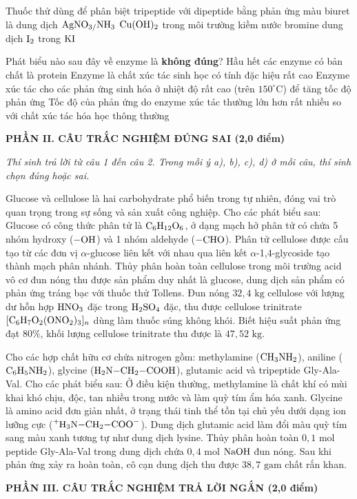 \documentclass[11pt,a4paper]{article}
\begin{document}
\begin{ex}
Thuốc thử dùng để phân biệt tripeptide với dipeptide bằng phản ứng màu biuret là
\choice
{dung dịch $\ce{AgNO3/NH3}$}
{\True $\ce{Cu(OH)2}$ trong môi trường kiềm}
{nước bromine}
{dung dịch $\ce{I2}$ trong $\ce{KI}$}
\end{ex}
\begin{ex}
Phát biểu nào sau đây về enzyme là \textbf{không đúng}?
\choice
{Hầu hết các enzyme có bản chất là protein}
{Enzyme là chất xúc tác sinh học có tính đặc hiệu rất cao}
{\True Enzyme xúc tác cho các phản ứng sinh hóa ở nhiệt độ rất cao (trên $150^\circ\text{C}$) để tăng tốc độ phản ứng}
{Tốc độ của phản ứng do enzyme xúc tác thường lớn hơn rất nhiều so với chất xúc tác hóa học thông thường}
\end{ex}
\vspace{6pt}
\noindent
{\color{mainGreen}\textbf{\large PHẦN II. CÂU TRẮC NGHIỆM ĐÚNG SAI (2,0 điểm)}}

\textit{Thí sinh trả lời từ câu 1 đến câu 2. Trong mỗi ý a), b), c), d) ở mỗi câu, thí sinh chọn đúng hoặc sai.}

\vspace{2pt}

\begin{ex}
Glucose và cellulose là hai carbohydrate phổ biến trong tự nhiên, đóng vai trò quan trọng trong sự sống và sản xuất công nghiệp. Cho các phát biểu sau:
\choiceTF
{\True Glucose có công thức phân tử là $\ce{C6H12O6}$, ở dạng mạch hở phân tử có chứa 5 nhóm hydroxy ($\ce{-OH}$) và 1 nhóm aldehyde ($\ce{-CHO}$).}
{Phân tử cellulose được cấu tạo từ các đơn vị $\alpha$-glucose liên kết với nhau qua liên kết $\alpha$-1,4-glycoside tạo thành mạch phân nhánh.}
{\True Thủy phân hoàn toàn cellulose trong môi trường acid vô cơ đun nóng thu được sản phẩm duy nhất là glucose, dung dịch sản phẩm có phản ứng tráng bạc với thuốc thử Tollens.}
{\True Đun nóng $32{,}4\text{ kg}$ cellulose với lượng dư hỗn hợp $\ce{HNO3}$ đặc trong $\ce{H2SO4}$ đặc, thu được cellulose trinitrate $[\ce{C6H7O2(ONO2)3}]_n$ dùng làm thuốc súng không khói. Biết hiệu suất phản ứng đạt $80\%$, khối lượng cellulose trinitrate thu được là $47{,}52\text{ kg}$.}
\end{ex}
\begin{ex}
Cho các hợp chất hữu cơ chứa nitrogen gồm: methylamine ($\ce{CH3NH2}$), aniline ($\ce{C6H5NH2}$), glycine ($\ce{H2N-CH2-COOH}$), glutamic acid và tripeptide Gly-Ala-Val. Cho các phát biểu sau:
\choiceTF
{\True Ở điều kiện thường, methylamine là chất khí có mùi khai khó chịu, độc, tan nhiều trong nước và làm quỳ tím ẩm hóa xanh.}
{\True Glycine là amino acid đơn giản nhất, ở trạng thái tinh thể tồn tại chủ yếu dưới dạng ion lưỡng cực ($\ce{^+H3N-CH2-COO^-}$).}
{Dung dịch glutamic acid làm đổi màu quỳ tím sang màu xanh tương tự như dung dịch lysine.}
{\True Thủy phân hoàn toàn $0{,}1\text{ mol}$ peptide Gly-Ala-Val trong dung dịch chứa $0{,}4\text{ mol}$ $\ce{NaOH}$ đun nóng. Sau khi phản ứng xảy ra hoàn toàn, cô cạn dung dịch thu được $38{,}7\text{ gam}$ chất rắn khan.}
\end{ex}
\vspace{6pt}
\noindent
{\color{mainGreen}\textbf{\large PHẦN III. CÂU TRẮC NGHIỆM TRẢ LỜI NGẮN (2,0 điểm)}}
\end{document}
